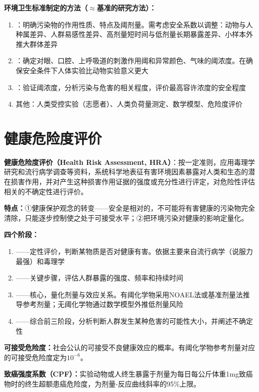 \documentclass[10pt,a4paper,oneside]{ctexbook}
\begin{document}
\begin{tipbox}
\textbf{环境卫生标准制定的方法（$\approx$基准的研究方法）：}
\begin{enumerate}[leftmargin=*]
    \item {}：明确污染物的作用性质、特点及阈剂量。需考虑安全系数以调整：动物与人种属差异、人群易感性差异、高剂量短时间与低剂量长期暴露差异、小样本外推大群体差异
    \item {}：确定对眼、口腔、上呼吸道的刺激作用阈和异常颜色、气味的阈浓度。在确保安全条件下人体实验比动物实验意义更大
    \item {}：验证阈浓度，分析污染与危害的相关程度，评价最高容许浓度的安全程度
    \item 其他：人类受控实验（志愿者）、人类负荷量测定、数学模型、危险度评价
\end{enumerate}
\end{tipbox}

\section{健康危险度评价}

\begin{keybox}
\textbf{健康危险度评价（Health Risk Assessment, HRA）}：按一定准则，应用毒理学研究和流行病学调查等资料，系统科学地表征有害环境因素暴露对人类和生态的潜在损害作用，并对产生这种损害作用证据的强度或充分性进行评定，对危险性评估相关的不确定性进行评价。

\textbf{特点：}①健康保护观念的转变——安全是相对的，不可能将有害健康的污染物完全清除，只能逐步控制使之处于可接受水平；②把环境污染对健康的影响定量化。

\textbf{四个阶段：}
\begin{enumerate}[leftmargin=*]
    \item {}——定性评价，判断某物质是否对健康有害。依据主要来自流行病学（说服力最强）和毒理学
    \item {}——关键步骤，评估人群暴露的强度、频率和持续时间
    \item {}——核心，量化剂量与效应关系。有阈化学物采用NOAEL法或基准剂量法推导参考剂量；无阈化学物通过数学模型外推低剂量风险
    \item {}——综合前三阶段，分析判断人群发生某种危害的可能性大小，并阐述不确定性
\end{enumerate}

\textbf{可接受危险度：}社会公认的可接受不良健康效应的概率。有阈化学物参考剂量对应的可接受危险度定为$10^{-6}$。

\textbf{致癌强度系数（CPF）：}实验动物或人终生暴露于剂量为每日每公斤体重1mg致癌物时的终生超额患癌危险度，为剂量-反应曲线斜率的95\%上限。
\end{keybox}
\end{document}
